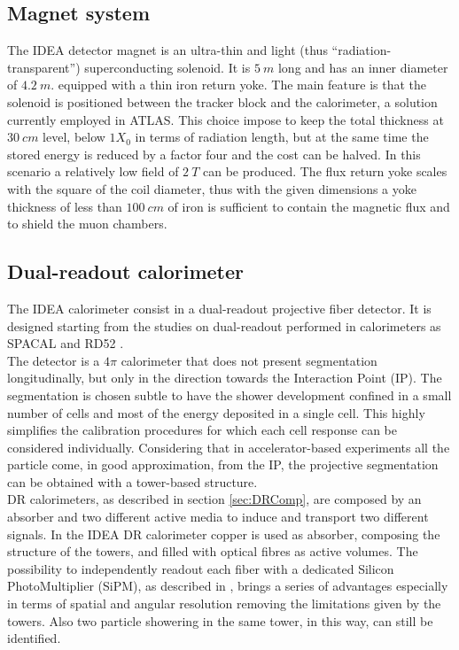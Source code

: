 \subsection{Magnet system}
The IDEA detector magnet is an ultra-thin and light (thus “radiation-transparent”) superconducting solenoid. It is $5\ m$ long and has an inner diameter of $4.2\ m$. equipped with a thin iron return yoke. The main feature is that the solenoid is positioned between the tracker block and the calorimeter, a solution currently employed in ATLAS.
This choice impose to keep the total thickness at $30\ cm$ level, below $1 X_0$ in terms of radiation length, but at the same time the stored energy is reduced by a factor four and the cost can be halved.
In this scenario a relatively low field of $2\ T$ can be produced.
The flux return yoke scales with the square of the coil diameter, thus with the given dimensions a yoke thickness of less than $100\ cm$ of iron is sufficient to contain the magnetic flux and to shield the muon chambers.

\subsection{Dual-readout calorimeter}
The IDEA calorimeter consist in a dual-readout projective fiber detector. It is designed starting from the studies on dual-readout performed in calorimeters as SPACAL \cite{SPACAL} and RD52 \cite{RD52}.\\
The detector is a $4\pi$ calorimeter that does not present segmentation longitudinally, but only in the direction towards the Interaction Point (IP).
The segmentation is chosen subtle to have the shower development confined in a small number of cells and most of the energy deposited in a single cell.
This highly simplifies the calibration procedures for which each cell response can be considered individually.
Considering that in accelerator-based experiments all the particle come, in good approximation, from the IP, the projective segmentation can be obtained with a tower-based structure.\\

DR calorimeters, as described in section \ref{sec:DRComp}, are composed by an absorber and two different active media to induce and transport two different signals. In the IDEA DR calorimeter copper is used as absorber, composing the structure of the towers, and filled with optical fibres as active volumes.
The possibility to independently readout each fiber with a dedicated Silicon PhotoMultiplier (SiPM), as described in \cite{Massi_tesi}, brings a series of advantages especially in terms of spatial and angular resolution removing the limitations given by the towers. Also two particle showering in the same tower, in this way, can still be identified.\\

